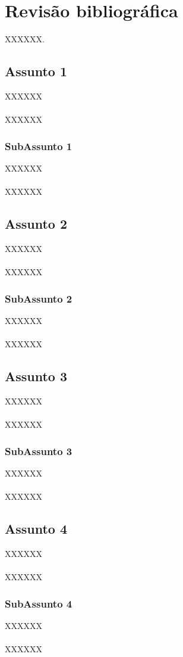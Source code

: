 \chapter{Revisão bibliográfica}
\label{Cap:RevisaoBibliografica}
\newcommand{\WidthAlgumaCoisa}{6.5 cm}

XXXXXX.

\section{Assunto 1}

XXXXXX
\\\\
XXXXXX

\subsection{SubAssunto 1}

XXXXXX
\\\\
XXXXXX

\section{Assunto 2}

XXXXXX
\\\\
XXXXXX

\subsection{SubAssunto 2}

XXXXXX
\\\\
XXXXXX

\section{Assunto 3}

XXXXXX
\\\\
XXXXXX

\subsection{SubAssunto 3}

XXXXXX
\\\\
XXXXXX

\section{Assunto 4}

XXXXXX
\\\\
XXXXXX

\subsection{SubAssunto 4}

XXXXXX
\\\\
XXXXXX


